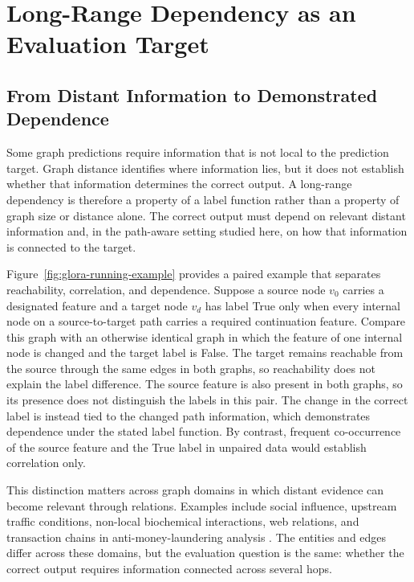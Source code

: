 \chapter{Long-Range Dependency as an Evaluation Target}

\section{From Distant Information to Demonstrated Dependence}

Some graph predictions require information that is not local to the prediction target.
Graph distance identifies where information lies, but it does not establish whether that information determines the correct output.
A long-range dependency is therefore a property of a label function rather than a property of graph size or distance alone.
The correct output must depend on relevant distant information and, in the path-aware setting studied here, on how that information is connected to the target.

Figure~\ref{fig:glora-running-example} provides a paired example that separates reachability, correlation, and dependence.
Suppose a source node \(v_0\) carries a designated feature and a target node \(v_d\) has label True only when every internal node on a source-to-target path carries a required continuation feature.
Compare this graph with an otherwise identical graph in which the feature of one internal node is changed and the target label is False.
The target remains reachable from the source through the same edges in both graphs, so reachability does not explain the label difference.
The source feature is also present in both graphs, so its presence does not distinguish the labels in this pair.
The change in the correct label is instead tied to the changed path information, which demonstrates dependence under the stated label function.
By contrast, frequent co-occurrence of the source feature and the True label in unpaired data would establish correlation only.

This distinction matters across graph domains in which distant evidence can become relevant through relations.
Examples include social influence, upstream traffic conditions, non-local biochemical interactions, web relations, and transaction chains in anti-money-laundering analysis \cite{zhou2025glora}.
The entities and edges differ across these domains, but the evaluation question is the same: whether the correct output requires information connected across several hops.

